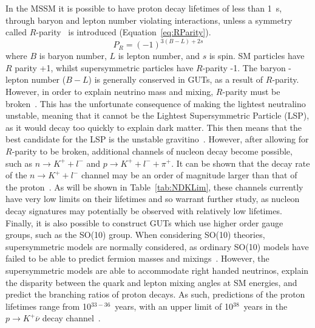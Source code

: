 In the MSSM it is possible to have proton decay lifetimes of less than 1~s, through baryon and lepton number violating interactions, unless a symmetry called $R$-parity~\citep{FARRAR1978575} is introduced (Equation~\ref{eq:RParity}).
\begin{equation}
  \label{eq:RParity}
  P_{R} = (-1)^{3(B-L)+2s}
\end{equation}
where $B$ is baryon number, $L$ is lepton number, and $s$ is spin. SM particles have $R$ parity +1, whilst supersymmetric particles have $R$-parity -1. The baryon - lepton number ($B-L$) is generally conserved in GUTs, as a result of $R$-parity. However, in order to explain neutrino mass and mixing, $R$-parity must be broken~\citep{Senjanovic:2009kr}. This has the unfortunate consequence of making the lightest neutralino unstable, meaning that it cannot be the Lightest Supersymmetric Particle (LSP), as it would decay too quickly to explain dark matter. This then means that the best candidate for the LSP is the unstable gravitino~\citep{Senjanovic:2009kr}. However, after allowing for $R$-parity to be broken, additional channels of nucleon decay become possible, such as $n \rightarrow K^{+} + l^{-}$ and $p \rightarrow K^{+} + l^{-} + \pi^{+}$. It can be shown that the decay rate of the $n \rightarrow K^{+} + l^{-}$ channel may be an order of magnitude larger than that of the proton~\citep{Senjanovic:2009kr, Vissani:1995hp}. As will be shown in Table~\ref{tab:NDKLim}, these channels currently have very low limits on their lifetimes and so warrant further study, as nucleon decay signatures may potentially be observed with relatively low lifetimes. \\

Finally, it is also possible to construct GUTs which use higher order gauge groups, such as the SO(10) group. When considering SO(10) theories, supersymmetric models are normally considered, as ordinary SO(10) models have failed to be able to predict fermion masses and mixings~\citep{Senjanovic:2009kr}. However, the supersymmetric models are able to accommodate right handed neutrinos, explain the disparity between the quark and lepton mixing angles at SM energies, and predict the branching ratios of proton decays. As such, predictions of the proton lifetimes range from 10$^{33-36}$~years, with an upper limit of 10$^{38}$~years in the $p \rightarrow K^{+} \overline{\nu}$ decay channel~\citep{Severson:2015dta}. \\

